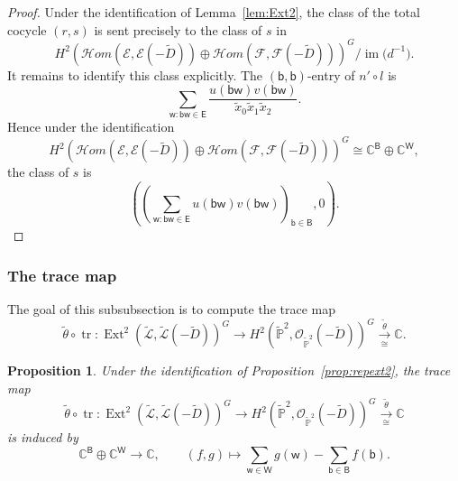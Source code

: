 \documentclass[dvipsnames,11pt]{article}
\newtheorem{proposition}[theorem]{Proposition}
\theoremstyle{definition}
\newcommand{\C}{{\mathbb C}}
\renewcommand{\P}{{\mathbb P}}
\def\B{\mathsf B}
\def\W{\mathsf W}
\def\w{\mathsf w}
\def\b{\mathsf b}
\def\E{\mathsf E}
\def\Ext{\operatorname{Ext}}
\def\cale{\mathcal E}
\def\calf{\mathcal F}
\def\Ext{\operatorname{Ext}}
\DeclareMathOperator{\tr}{tr}
\begin{document}
\begin{proof}
Under the identification of Lemma~\ref{lem:Ext2}, the class of the total cocycle \((r,s)\) is sent precisely to the class of \(s\) in
\[
H^2(\mathcal H om(\cale,\cale(-\widetilde D))\oplus \mathcal H om(\calf,\calf(-\widetilde D)))^G
\Big/
\operatorname{im}\bigl(d^{-1}\bigr).
\]
It remains to identify this class explicitly. The \((\b,\b)\)-entry of \(n'\circ l\) is
\[
\sum_{\w:\b\w\in \E}
\frac{u(\b\w)v(\b\w)}{\widetilde x_0\widetilde x_1\widetilde x_2}.
\]
Hence under the identification
\[
H^2(\mathcal H om(\cale,\cale(-\widetilde D))\oplus \mathcal H om(\calf,\calf(-\widetilde D)))^G
\cong \C^\B\oplus \C^\W,
\]
the class of \(s\) is
\[
\left(
\left(\sum_{\w:\b\w\in \E}u(\b\w)v(\b\w)\right)_{\b\in \B},
0
\right).
\]
\end{proof}

\subsubsection{The trace map}\label{sec:trace}

The goal of this subsubsection is to compute the trace map
\[
\widetilde \theta\circ\tr:
\Ext^2(\widetilde{\mathcal L},\widetilde{\mathcal L}(-\widetilde D))^G
\rightarrow
H^2(\widetilde\P^2,\mathcal O_{\widetilde\P^2}(-\widetilde D))^G
\xrightarrow[\cong]{\widetilde \theta}
\C.
\]

\begin{proposition}\label{prop:trace-ext2}
Under the identification of Proposition~\ref{prop:repext2}, the trace map
\[
\widetilde \theta\circ\tr:
\Ext^2(\widetilde{\mathcal L},\widetilde{\mathcal L}(-\widetilde D))^G
\rightarrow
H^2(\widetilde\P^2,\mathcal O_{\widetilde\P^2}(-\widetilde D))^G
\xrightarrow[\cong]{\widetilde \theta}
\C
\]
is induced by
\[
\C^{\B}\oplus \C^{\W}\rightarrow \C,
\qquad
(f,g)\mapsto \sum_{\w\in\W}g(\w)-\sum_{\b\in\B}f(\b).
\]
\end{proposition}
\end{document}
